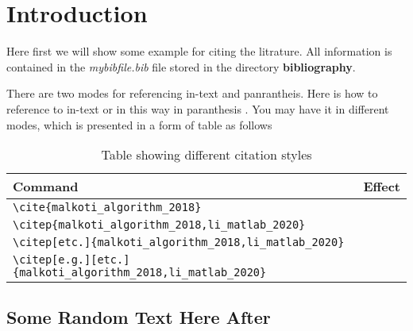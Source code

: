 \chapter{Introduction}

Here first we will show some example for citing the litrature. 
All information is contained in the \textit{mybibfile.bib} file stored in the 
directory \textbf{bibliography}. 


There are two modes for referencing in-text and panrantheis. 
Here is how to reference to in-text  \cite{malkoti_algorithm_2018} or in this way 
in paranthesis \citep{li_matlab_2020}.   
%
You may have it in different modes, which is presented in a form of table as follows


\begin{table}
\caption{Table showing different citation styles}
\label{tab:citation_style}
\begin{tabular}{ll}	
	\hline
	Command  & Effect \\
	\hline
	\verb|\cite{malkoti_algorithm_2018}|   &\cite{malkoti_algorithm_2018}\\
	\verb|\citep{malkoti_algorithm_2018,li_matlab_2020}|   &\citep{malkoti_algorithm_2018,li_matlab_2020}\\
	\verb|\citep[etc.]{malkoti_algorithm_2018,li_matlab_2020}|   &\citep[etc.]{malkoti_algorithm_2018,li_matlab_2020}\\
	\verb|\citep[e.g.][etc.]{malkoti_algorithm_2018,li_matlab_2020}|   &\citep[e.g.][etc.]{malkoti_algorithm_2018,li_matlab_2020} \\
	\hline	
\end{tabular}

\end{table}


\section{Some Random Text Here After}
\lipsum[1-20]
  